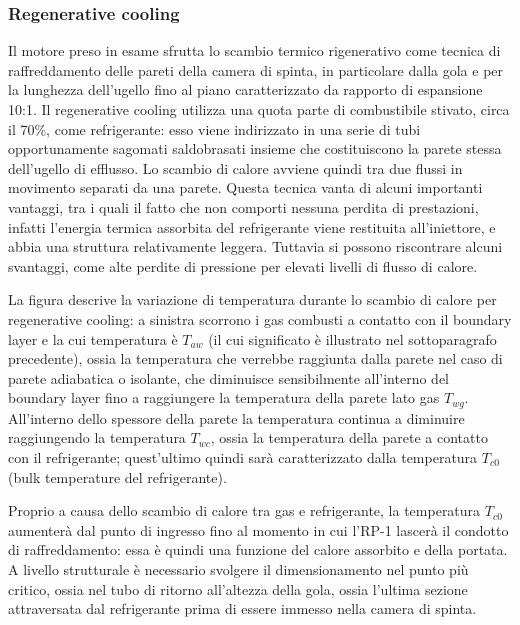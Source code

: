 \subsubsection{Regenerative cooling}
\label{subsubsec:regenerative cooling}

Il motore preso in esame sfrutta lo scambio termico rigenerativo come tecnica di raffreddamento delle pareti della camera di spinta, in particolare dalla gola e per la lunghezza dell'ugello fino al piano caratterizzato da rapporto di espansione 10:1. Il regenerative cooling utilizza una quota parte di combustibile stivato, circa il 70\%, come refrigerante: esso viene indirizzato in una serie di tubi opportunamente sagomati saldobrasati insieme che costituiscono la parete stessa dell'ugello di efflusso. Lo scambio di calore avviene quindi tra due flussi in movimento separati da una parete.
Questa tecnica vanta di alcuni importanti vantaggi, tra i quali il fatto che non comporti nessuna perdita di prestazioni, infatti l'energia termica assorbita del refrigerante viene restituita all'iniettore, e abbia una struttura relativamente leggera. Tuttavia si possono riscontrare alcuni svantaggi, come alte perdite di pressione per elevati livelli di flusso di calore.


La figura descrive la variazione di temperatura durante lo scambio di calore per regenerative cooling: a sinistra scorrono i gas combusti a contatto con il boundary layer e la cui temperatura è $T_{aw}$ (il cui significato è illustrato nel sottoparagrafo precedente), ossia la temperatura che verrebbe raggiunta dalla parete nel caso di parete adiabatica o isolante, che diminuisce sensibilmente all'interno del boundary layer fino a raggiungere la temperatura della parete lato gas $T_{wg}$. All'interno dello spessore della parete la temperatura continua a diminuire raggiungendo la temperatura $T_{wc}$, ossia la temperatura della parete a contatto con il refrigerante; quest'ultimo quindi sarà caratterizzato dalla temperatura $T_{c0}$ (bulk temperature del refrigerante).

Proprio a causa dello scambio di calore tra gas e refrigerante, la temperatura $T_{c0}$ aumenterà dal punto di ingresso fino al momento in cui l'RP-1 lascerà il condotto di raffreddamento: essa è quindi una funzione del calore assorbito e della portata. A livello strutturale è necessario svolgere il dimensionamento nel punto più critico, ossia nel tubo di ritorno all'altezza della gola, ossia l'ultima sezione attraversata dal refrigerante prima di essere immesso nella camera di spinta.

